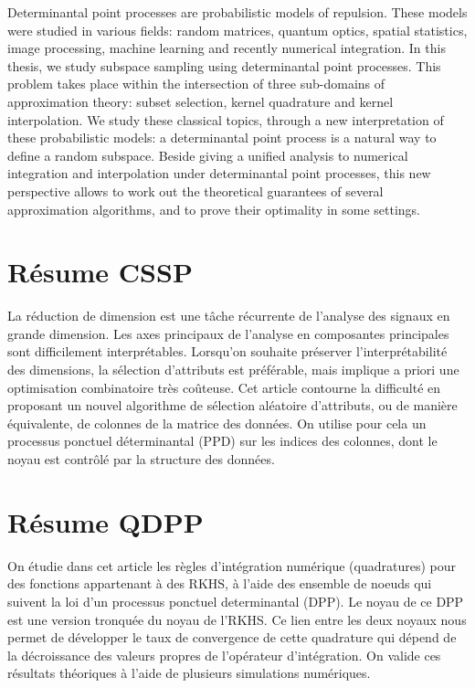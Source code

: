 \documentclass[twoside,11pt]{book}
\numberwithin{theorem}{chapter}
\numberwithin{definition}{chapter}
\numberwithin{proposition}{chapter}
\numberwithin{corollary}{chapter}
\numberwithin{example}{chapter}
\numberwithin{lemma}{chapter}
\numberwithin{assumption}{chapter}
\numberwithin{equation}{chapter}
\numberwithin{figure}{chapter}
\begin{document}
Determinantal point processes are probabilistic models of repulsion.
These models were studied in various fields: random matrices, quantum optics, spatial statistics, image processing, machine learning and recently numerical integration.
In this thesis, we study subspace sampling using determinantal point processes. This problem takes place within the intersection of three sub-domains of approximation theory: subset selection, kernel quadrature and kernel interpolation. We study these classical topics, through a new interpretation of these probabilistic models: a determinantal point process is a natural way to define a random  subspace. Beside giving a unified analysis to numerical integration and interpolation under determinantal point processes, this new perspective allows to work out the theoretical guarantees of several approximation algorithms, and to prove their optimality in some settings.



\section{Résume CSSP}
La réduction de dimension est une tâche récurrente de l'analyse des signaux en grande dimension. Les axes principaux de l'analyse en composantes principales sont difficilement interprétables. Lorsqu'on souhaite préserver l’interprétabilité des dimensions, la sélection d'attributs est préférable, mais implique a priori une optimisation combinatoire très coûteuse. Cet article contourne la difficulté en proposant un nouvel algorithme de sélection aléatoire d’attributs, ou de manière équivalente, de colonnes de la matrice des données. On utilise pour cela un processus ponctuel déterminantal (PPD) sur les indices des colonnes, dont le noyau est contrôlé par la structure des données.



\section{Résume QDPP}
\newpage
On étudie dans cet article les règles d'intégration numérique (quadratures) pour des fonctions appartenant à des RKHS, à l'aide des ensemble de noeuds qui suivent la loi d'un processus ponctuel determinantal (DPP). Le noyau de ce DPP est une version tronquée du noyau de l'RKHS. Ce lien entre les deux noyaux nous permet de développer le taux de convergence de cette quadrature qui dépend de la décroissance des valeurs propres de l'opérateur d'intégration.
On valide ces résultats théoriques à l'aide de plusieurs simulations numériques.
\end{document}
